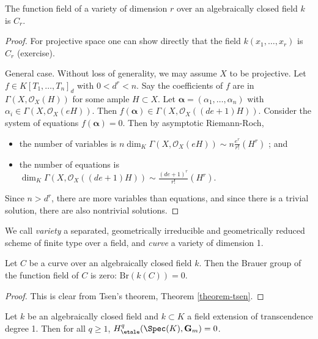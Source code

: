 \begin{theorem}
\label{theorem-tsen}
The function field of a variety of dimension $r$ over an algebraically closed
field $k$ is $C_r$.
\end{theorem}

\begin{proof}
For projective space one can show directly that the field
$k(x_1, \ldots, x_r)$ is $C_r$ (exercise).

\medskip\noindent
General case. Without loss of generality, we may assume $X$ to be projective.
Let $f \in K[T_1, \dots, T_n]_d$ with $0 < d^r <n$. Say the coefficients of $f$
are in $\Gamma(X, \mathcal{O}_X(H))$ for some ample $H \subset X$. Let
$\mathbf{\alpha} = (\alpha_1, \dots, \alpha_n)$ with $\alpha_i \in \Gamma(X,
\mathcal{O}_X(eH))$. Then $f(\mathbf{\alpha}) \in \Gamma(X,
\mathcal{O}_X((de+1)H))$. Consider the system of equations $f(\mathbf{\alpha})
=0$. Then by asymptotic Riemann-Roch,
\begin{itemize}
\item
the number of variables is $n\dim_K \Gamma(X, \mathcal{O}_X(eH)) \sim
n\frac{e^r}{r!} (H^r)$ ; and
\item
the number of equations is $\dim_K \Gamma(X, \mathcal{O}_X((de+1)H)) \sim
\frac{(de+1)^r}{r!} (H^r).$
\end{itemize}
Since $n> d^r$, there are more variables than equations, and since there is a
trivial solution, there are also nontrivial solutions.
\end{proof}

\begin{definition}
\label{definition-variety}
We call {\it variety} a separated, geometrically irreducible and geometrically
reduced scheme of finite type over a field, and {\it curve} a variety of
dimension 1.
\end{definition}

\begin{lemma}
\label{lemma-curve-brauer-zero}
Let $C$ be a curve over an algebraically closed field $k$. Then
the Brauer group of the function field of $C$ is zero:
$\text{Br}(k(C)) = 0$.
\end{lemma}

\begin{proof}
This is clear from Tsen's theorem,
Theorem \ref{theorem-tsen}.
\end{proof}

\begin{lemma}
\label{lemma-cohomology-Gm-function-field-curve}
Let $k$ be an algebraically closed field and $k \subset K$ a field extension
of transcendence degree 1. Then for all $q \geq 1$,
$H_\etale^q(\Spec(K), \mathbf{G}_m) = 0$.
\end{lemma}

